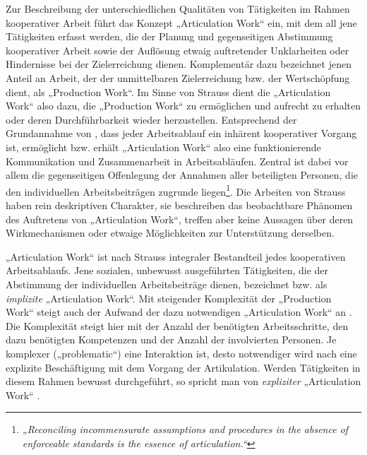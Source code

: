 Zur Beschreibung der unterschiedlichen Qualitäten von Tätigkeiten im Rahmen kooperativer Arbeit führt \citet{Strauss85} das Konzept „Articulation Work“ ein, mit dem all jene Tätigkeiten erfasst werden, die der Planung und gegenseitigen Abstimmung kooperativer Arbeit sowie der Auflösung etwaig auftretender Unklarheiten oder Hindernisse bei der Zielerreichung dienen. Komplementär dazu bezeichnet \citet{Fujimura87} jenen Anteil an Arbeit, der der unmittelbaren Zielerreichung bzw. der Wertschöpfung dient, als „Production Work“. Im Sinne von Strauss dient die „Articulation Work“ also dazu, die „Production Work“ zu ermöglichen und aufrecht zu erhalten oder deren Durchführbarkeit wieder herzustellen. Entsprechend der Grundannahme von \citep{Strauss85}, dass jeder Arbeitsablauf ein inhärent kooperativer Vorgang ist, ermöglicht bzw. erhält „Articulation Work“ also eine funktionierende Kommunikation und Zusammenarbeit in Arbeitsabläufen. Zentral ist dabei vor allem die gegenseitigen Offenlegung der Annahmen aller beteiligten Personen, die den individuellen Arbeitsbeiträgen zugrunde liegen\footnote{\emph{„Reconciling incommensurate assumptions and procedures in the absence of enforceable standards is the essence of articulation.“}\citep[][S. 266]{Gerson86}}. Die Arbeiten von Strauss haben rein deskriptiven Charakter, sie beschreiben das beobachtbare Phänomen des Auftretens von „Articulation Work“, treffen aber keine Aussagen über deren Wirkmechanismen oder etwaige Möglichkeiten zur Unterstützung derselben.

„Articulation Work“ ist nach Strauss integraler Bestandteil jedes kooperativen Arbeitsablaufs. Jene sozialen, unbewusst ausgeführten Tätigkeiten, die der Abstimmung der individuellen Arbeitsbeiträge dienen, bezeichnet \citet{Strauss88} bzw. \citet{Fjuk97} als \emph{implizite} „Articulation Work“.  Mit steigender Komplexität der „Production Work“ steigt auch der Aufwand der dazu notwendigen „Articulation Work“ an \citep{Strauss88}. Die Komplexität steigt hier mit der Anzahl der benötigten Arbeitsschritte, den dazu benötigten Kompetenzen und der Anzahl der involvierten Personen. Je komplexer („problematic“) eine Interaktion ist, desto notwendiger wird nach \citep{Strauss88} eine explizite Beschäftigung mit dem Vorgang der Artikulation. Werden Tätigkeiten in diesem Rahmen bewusst durchgeführt, so spricht man von \emph{expliziter} „Articulation Work“ \citep{Strauss88} \citep{Fjuk97}. 

